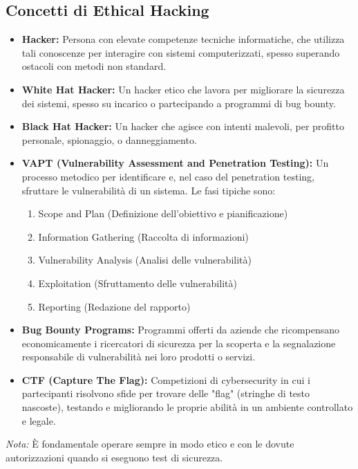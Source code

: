 \subsection{Concetti di Ethical Hacking}
\begin{itemize}
    \item \textbf{Hacker:} Persona con elevate competenze tecniche informatiche, che utilizza tali conoscenze per interagire con sistemi computerizzati, spesso superando ostacoli con metodi non standard.
    \item \textbf{White Hat Hacker:} Un hacker etico che lavora per migliorare la sicurezza dei sistemi, spesso su incarico o partecipando a programmi di bug bounty.
    \item \textbf{Black Hat Hacker:} Un hacker che agisce con intenti malevoli, per profitto personale, spionaggio, o danneggiamento.
    \item \textbf{VAPT (Vulnerability Assessment and Penetration Testing):} Un processo metodico per identificare e, nel caso del penetration testing, sfruttare le vulnerabilità di un sistema. Le fasi tipiche sono:
    \begin{enumerate}
        \item Scope and Plan (Definizione dell'obiettivo e pianificazione)
        \item Information Gathering (Raccolta di informazioni)
        \item Vulnerability Analysis (Analisi delle vulnerabilità)
        \item Exploitation (Sfruttamento delle vulnerabilità)
        \item Reporting (Redazione del rapporto)
    \end{enumerate}
    \item \textbf{Bug Bounty Programs:} Programmi offerti da aziende che ricompensano economicamente i ricercatori di sicurezza per la scoperta e la segnalazione responsabile di vulnerabilità nei loro prodotti o servizi.
    \item \textbf{CTF (Capture The Flag):} Competizioni di cybersecurity in cui i partecipanti risolvono sfide per trovare delle "flag" (stringhe di testo nascoste), testando e migliorando le proprie abilità in un ambiente controllato e legale.
\end{itemize}
\textit{Nota:} È fondamentale operare sempre in modo etico e con le dovute autorizzazioni quando si eseguono test di sicurezza.

